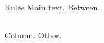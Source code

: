 \documentclass[aspectratio=169]{beamer}
\begin{document}
\begin{frame}{Rules}
Main text.
\sporkCodeRule
Between.

\vspace{5mm}
\begin{columns}[T,onlytextwidth]
Column.
\sporkCodeRule
{}
Other.
\end{columns}
\end{frame}
\end{document}
